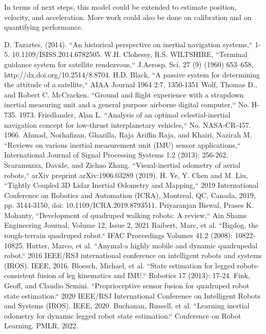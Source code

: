\documentclass[conference]{IEEEtran}
\begin{document}
In terms of next steps, this model could be extended to estimate position, velocity, and acceleration. More work could also be done on calibration and on quantifying performance.


\begin{thebibliography}{00}
 D. Tazartes, (2014). ``An historical perspective on inertial navigation systems,`` 1-5. 10.1109/ISISS.2014.6782505. 
 W.H. Clohessy, R.S. WILTSHIRE, ``Terminal guidance system for satellite rendezvous,`` J.Aerosp. Sci. 27 (9) (1960) 653–658, http://dx.doi.org/10.2514/8.8704.
 H.D. Black, ``A passive system for determining the attitude of a satellite,`` AIAA Journal 1964 2:7, 1350-1351
 Wolf, Thomas D., and Robert C. McCracken. ``Ground and flight experience with a strapdown inertial measuring unit and a general purpose airborne digital computer,`` No. H-735. 1973.
 Friedlander, Alan L. ``Analysis of an optimal celestial-inertial navigation concept for low-thrust interplanetary vehicles,`` No. NASA-CR-457. 1966.
 Ahmad, Norhafizan, Ghazilla, Raja Ariffin Raja, and Khairi, Nazirah M. ``Reviews on various inertial measurement unit (IMU) sensor applications,`` International Journal of Signal Processing Systems 1.2 (2013): 256-262.
 Scaramuzza, Davide, and Zichao Zhang. ``Visual-inertial odometry of aerial robots,`` arXiv preprint arXiv:1906.03289 (2019).
 H. Ye, Y. Chen and M. Liu, ``Tightly Coupled 3D Lidar Inertial Odometry and Mapping,`` 2019 International Conference on Robotics and Automation (ICRA), Montreal, QC, Canada, 2019, pp. 3144-3150, doi: 10.1109/ICRA.2019.8793511.
 Priyaranjan Biswal, Prases K. Mohanty, ``Development of quadruped walking robots: A review,`` Ain Shams Engineering Journal, Volume 12, Issue 2, 2021
 Raibert, Marc, et al. ``Bigdog, the rough-terrain quadruped robot.`` IFAC Proceedings Volumes 41.2 (2008): 10822-10825.
 Hutter, Marco, et al. ``Anymal-a highly mobile and dynamic quadrupedal robot.`` 2016 IEEE/RSJ international conference on intelligent robots and systems (IROS). IEEE, 2016.
 Bloesch, Michael, et al. ``State estimation for legged robots-consistent fusion of leg kinematics and IMU.`` Robotics 17 (2013): 17-24.
 Fink, Geoff, and Claudio Semini. ``Proprioceptive sensor fusion for quadruped robot state estimation.`` 2020 IEEE/RSJ International Conference on Intelligent Robots and Systems (IROS). IEEE, 2020.
 Buchanan, Russell, et al. ``Learning inertial odometry for dynamic legged robot state estimation.`` Conference on Robot Learning. PMLR, 2022.

\end{thebibliography}
\end{document}
